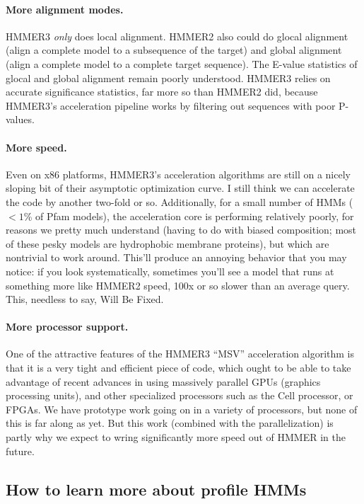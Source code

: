 \paragraph{More alignment modes.} HMMER3 \emph{only} does local
alignment. HMMER2 also could do glocal alignment (align a complete
model to a subsequence of the target) and global alignment (align a
complete model to a complete target sequence). The E-value statistics
of glocal and global alignment remain poorly understood. HMMER3 relies
on accurate significance statistics, far more so than HMMER2 did,
because HMMER3's acceleration pipeline works by filtering out
sequences with poor P-values.

\paragraph{More speed.} Even on x86 platforms, HMMER3's acceleration
algorithms are still on a nicely sloping bit of their asymptotic
optimization curve. I still think we can accelerate the code by
another two-fold or so. Additionally, for a small number of HMMs
($<1$\% of Pfam models), the acceleration core is performing
relatively poorly, for reasons we pretty much understand (having to do
with biased composition; most of these pesky models are hydrophobic
membrane proteins), but which are nontrivial to work around. This'll
produce an annoying behavior that you may notice: if you look
systematically, sometimes you'll see a model that runs at something
more like HMMER2 speed, 100x or so slower than an average query. This,
needless to say, Will Be Fixed.

\paragraph{More processor support.} One of the attractive features of the
HMMER3 ``MSV'' acceleration algorithm is that it is a very tight and
efficient piece of code, which ought to be able to take advantage of
recent advances in using massively parallel GPUs (graphics processing
units), and other specialized processors such as the Cell processor,
or FPGAs. We have prototype work going on in a variety of processors,
but none of this is far along as yet. But this work (combined with the
parallelization) is partly why we expect to wring significantly more
speed out of HMMER in the future.


\subsection{How to learn more about profile HMMs}

